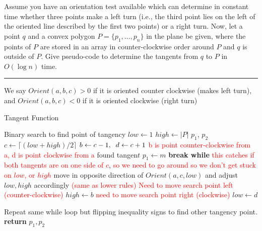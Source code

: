 \documentclass[11pt]{article}
\begin{document}

Assume you have an orientation test available which can determine in constant
time whether three points make a left turn (i.e., the third point lies on the
left of the oriented line described by the first two points) or a right turn.
Now, let a point $q$ and a convex polygon $P = \{ p_1, \ldots , p_n \}$ in the
plane be given, where the points of $P$ are stored in an array in
counter-clockwise order around $P$ and $q$ is outside of $P$. Give pseudo-code
to determine the tangents from $q$ to $P$ in $O(\log n)$ time.

\hrule

We say $Orient(a,b,c) > 0$ if it is oriented counter clockwise (makes left turn), and $Orient(a,b,c) < 0$ if it is oriented clockwise (right turn)

\begin{algorithm}
    \caption{Tangent Function}
    \label{alg:prob1}
    \begin{algorithmic}[1]
        \State Binary search to find point of tangency
        \State $low \gets 1$
        \State $high \gets |P|$
        \State $p_1$, $p_2$
            \State $c \gets \lceil (low + high)/2 \rceil$
            \State $b \gets c-1, \sp d \gets c + 1$ \quad \textcolor{red}{b is point counter-clockwise from a, d is point clockwise from a}
                \State found tangen$t$
                \State $p_1 \gets m$
                \State \textbf{break while}
                \State \textcolor{red}{this catches if both tangents are on one side of $c$}, 
                \State \textcolor{red}{so we need to go around so we don't get stuck on $low$, or $high$}
                \State move in opposite direction of $Orient(a, c, low)$ and adjust $low, high$ accordingly 
                \State \textcolor{red}{(same as lower rules)}
                \State \textcolor{red}{Need to move search point left (counter-clockwise)}
                \State $high \gets b$
                \State \textcolor{red}{need to move search point right (clockwise)}
                \State $low \gets d$
            \EndIf
        \EndWhile

        \State Repeat same while loop but flipping inequality signs to find other tangency point.
        \State \textbf{return} $p_1, p_2$
    \EndFunction
    \end{algorithmic}
\end{algorithm}
\end{document}
